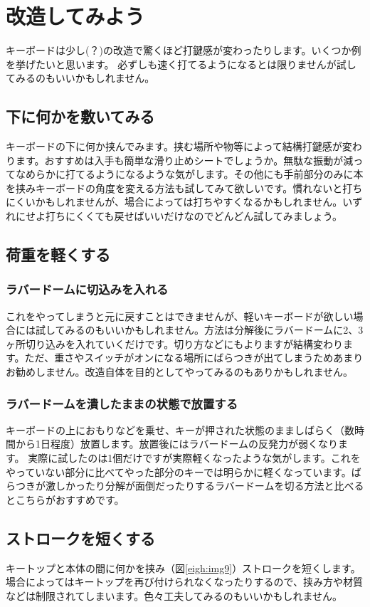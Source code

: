 \section{改造してみよう}
キーボードは少し(？)の改造で驚くほど打鍵感が変わったりします。いくつか例を挙げたいと思います。 必ずしも速く打てるようになるとは限りませんが試してみるのもいいかもしれません。

\subsection{下に何かを敷いてみる}
キーボードの下に何か挟んでみます。挟む場所や物等によって結構打鍵感が変わります。おすすめは入手も簡単な滑り止めシートでしょうか。無駄な振動が減ってなめらかに打てるようになるような気がします。その他にも手前部分のみに本を挟みキーボードの角度を変える方法も試してみて欲しいです。慣れないと打ちにくいかもしれませんが、場合によっては打ちやすくなるかもしれません。いずれにせよ打ちにくくても戻せばいいだけなのでどんどん試してみましょう。

\subsection{荷重を軽くする}

\subsubsection*{ラバードームに切込みを入れる}
これをやってしまうと元に戻すことはできませんが、軽いキーボードが欲しい場合には試してみるのもいいかもしれません。方法は分解後にラバードームに2、3ヶ所切り込みを入れていくだけです。切り方などにもよりますが結構変わります。ただ、重さやスイッチがオンになる場所にばらつきが出てしまうためあまりお勧めしません。改造自体を目的としてやってみるのもありかもしれません。

\subsubsection*{ラバードームを潰したままの状態で放置する}

キーボードの上におもりなどを乗せ、キーが押された状態のまましばらく（数時間から1日程度）放置します。放置後にはラバードームの反発力が弱くなります。
実際に試したのは1個だけですが実際軽くなったような気がします。これをやっていない部分に比べてやった部分のキーでは明らかに軽くなっています。ばらつきが激しかったり分解が面倒だったりするラバードームを切る方法と比べるとこちらがおすすめです。

\subsection{ストロークを短くする}
キートップと本体の間に何かを挟み（図\ref{eigh:img9}）ストロークを短くします。場合によってはキートップを再び付けられなくなったりするので、挟み方や材質などは制限されてしまいます。色々工夫してみるのもいいかもしれません。

